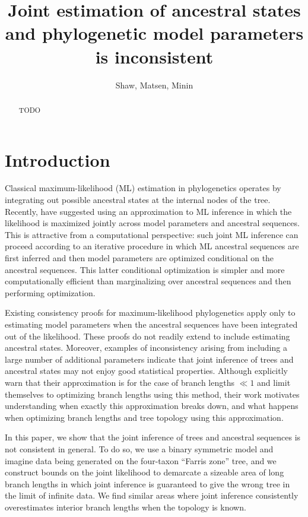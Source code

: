\documentclass{article}
\title{Joint estimation of ancestral states and phylogenetic model parameters is inconsistent}
\author{Shaw, Matsen, Minin}
\begin{document}
\maketitle

\renewcommand{\arraystretch}{1.2} %

\begin{abstract}
TODO
\end{abstract}

\section*{Introduction}

Classical maximum-likelihood (ML) estimation in phylogenetics operates by integrating out possible ancestral states at the internal nodes of the tree.
Recently, \cite{Sagulenko2017-jo} have suggested using an approximation to ML inference in which the likelihood is maximized jointly across model parameters and ancestral sequences.
This is attractive from a computational perspective: such joint ML inference can proceed according to an iterative procedure in which ML ancestral sequences are first inferred and then model parameters are optimized conditional on the ancestral sequences.
This latter conditional optimization is simpler and more computationally efficient than marginalizing over ancestral sequences and then performing optimization.

Existing consistency proofs for maximum-likelihood phylogenetics \cite{RoyChoudhury2015-ta} apply only to estimating model parameters when the ancestral sequences have been integrated out of the likelihood.
These proofs do not readily extend to include estimating ancestral states.
Moreover, examples of inconsistency arising from including a large number of additional parameters \cite{Neyman1948-tt} indicate that joint inference of trees and ancestral states may not enjoy good statistical properties.
Although \cite{Sagulenko2017-jo} explicitly warn that their approximation is for the case of branch lengths $\ll 1$ and limit themselves to optimizing branch lengths using this method, their work motivates understanding when exactly this approximation breaks down, and what happens when optimizing branch lengths and tree topology using this approximation.

In this paper, we show that the joint inference of trees and ancestral sequences is not consistent in general.
To do so, we use a binary symmetric model and imagine data being generated on the four-taxon ``Farris zone'' \cite{Siddall1998-hq} tree, and we construct bounds on the joint likelihood to demarcate a sizeable area of long branch lengths in which joint inference is guaranteed to give the wrong tree in the limit of infinite data.
We find similar areas where joint inference consistently overestimates interior branch lengths when the topology is known.
\end{document}
